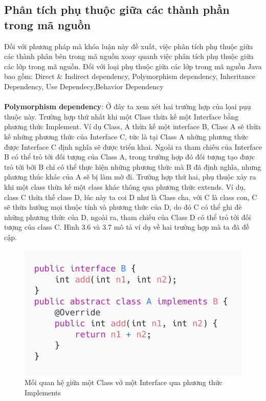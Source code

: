 \documentclass[12pt]{report}
\begin{document}
\subsection{Phân tích phụ thuộc giữa các thành phần trong mã nguồn}
Đối với phương pháp mà khóa luận này đề xuất, việc phân tích phụ thuộc giữa các thành phân bên trong mã nguồn xoay quanh việc phân tích phụ thuộc giữa các lớp trong mã nguồn. Đối với loại phụ thuộc giữa các lớp trong mã nguồn Java bao gồm: Direct \& Indirect dependency, Polymorphism dependency, Inheritance Dependency, Use Dependecy,Behavior Dependency\\\\
\textbf{Polymorphism dependency}: Ở đây ta xem xét hai trường hợp của lọai pụụ thuộc này. Trường hợp thứ nhất khi một Class thừa kế một Interface bằng phương thức Implement. Ví dụ Class, A  thừa kế một interface B, Class A sẽ thừa kế những phương thức của Interface C, tức là tại Class A những phương thức được Interface C định nghĩa sẽ được triển khai. Ngoài ra tham chiếu của Interface B có thể trỏ tới đối tượng của Class A, trong trường hợp đó đối tượng tạo được trỏ tới bởi B chỉ có thể thực hiện những phương thức mà B đã định nghĩa, nhưng phương thúc khác của A sẽ bị làm mờ đi. Trường hợp thứ hai, phụ thuộc xảy ra khi một class thừa kế một class khác thông qua phương thức extends. Ví dụ, class C thừa thế class D, lúc này ta coi D như là Class cha, với C là class con, C sẽ thừa hưởng mọi thuộc tính và phương thức của  D, do đó C có thể ghi đè những phương thức của D, ngoài ra, tham chiếu của Class D có thể trỏ tới đối tượng của class C. Hình 3.6 và 3.7 mô tả ví dụ về hai trường hợp mà ta đã đề cập.
\begin{figure}[!htbp]
	\vspace*{-2cm}
	\centering
	\includegraphics[scale=0.5]{images/AimplementsB}
	\caption{Mối quan hệ giữa một Class vớ một Interface qua phương thức Implements}
	\label{fig:A_implemets_B}
\end{figure}
\end{document}
